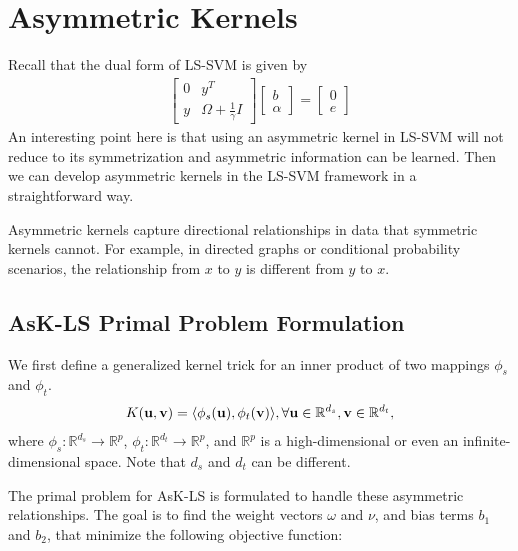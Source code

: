 \section{Asymmetric Kernels}
\label{sec:asymmetric_kernels}

Recall that the dual form of LS-SVM is given by
\begin{align*}
	\begin{bmatrix}
	0 & y^T \\
	y & \Omega + \frac{1}{\gamma} I
	\end{bmatrix}
	\begin{bmatrix}
	b \\
	\alpha
	\end{bmatrix}
	=
	\begin{bmatrix}
	0 \\
	e
	\end{bmatrix}
\end{align*}
An interesting point here is that using an asymmetric kernel in LS-SVM will not reduce to its symmetrization and asymmetric information can be learned. Then we can develop asymmetric kernels in the LS-SVM framework in a straightforward way.

Asymmetric kernels capture directional relationships in data that symmetric kernels cannot. For example, in directed graphs or conditional probability scenarios, the relationship from $x$ to $y$ is different from $y$ to $x$.

\subsection{AsK-LS Primal Problem Formulation}
We first define a generalized kernel trick for an inner product of two mappings $\phi_s$ and $\phi_t$.
\begin{align*}
	K({\mathbf{u}}, {\mathbf{v}}) = \langle \phi_s({\mathbf{u}}), \phi_t({\mathbf{v}})\rangle, \forall {\mathbf{u}} \in \mathbb{R}^{d_s}, {\mathbf{v}} \in \mathbb{R}^{d_t},
\end{align*}
where $\phi_s: \mathbb{R}^{d_s}\to \mathbb{R}^{p}$, $\phi_t: \mathbb{R}^{d_t}\to \mathbb{R}^{p}$, and $\mathbb{R}^p$ is a high-dimensional or even an infinite-dimensional space. Note that $d_s$ and $d_t$ can be different. 

The primal problem for AsK-LS is formulated to handle these asymmetric relationships. The goal is to find the weight vectors \( \omega \) and \( \nu \), and bias terms \( b_1 \) and \( b_2 \), that minimize the following objective function:

